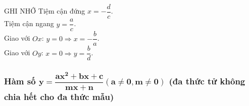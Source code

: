 \begin{minipage}[b]{6.5cm}
    \begin{khung4}{GHI NHỚ}
         Tiệm cận đứng $x=-\dfrac{d}{c}$.\\
         Tiệm cận ngang $y=\dfrac{a}{c}$.\\
         Giao với $Ox$: $y=0 \Rightarrow x=-\dfrac{b}{a}$.\\
         Giao với $Oy$: $x=0 \Rightarrow y=\dfrac{b}{d}$.\\
    \end{khung4}
\end{minipage}
\subsubsection{Hàm số $\mathbf{y = \dfrac{{a{x^2} + bx + c}}{{mx + n}}\left( {a \ne 0,m \ne 0} \right)}$ (đa thức tử không chia hết cho đa thức mẫu)}
